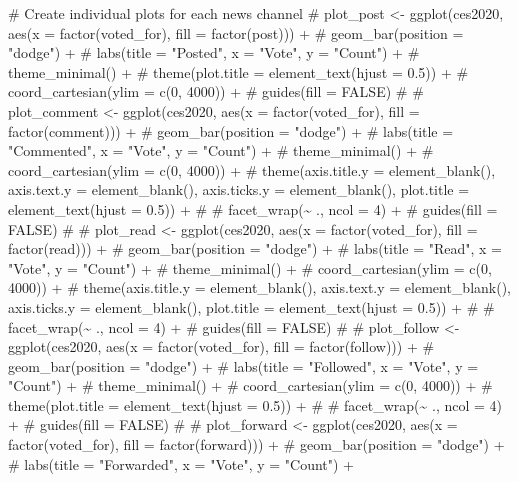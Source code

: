 \documentclass[
  letterpaper,
  DIV=11,
  numbers=noendperiod]{scrartcl}
\newenvironment{Shaded}{\begin{snugshade}}{\end{snugshade}}
\newcommand{\CommentTok}[1]{\textcolor[rgb]{0.37,0.37,0.37}{#1}}
\begin{document}
\begin{Shaded}
\begin{Highlighting}[]
\CommentTok{\# Create individual plots for each news channel}
\CommentTok{\# plot\_post \textless{}{-} ggplot(ces2020, aes(x = factor(voted\_for), fill = factor(post))) +}
\CommentTok{\#   geom\_bar(position = "dodge") +}
\CommentTok{\#   labs(title = "Posted", x = "Vote", y = "Count") +}
\CommentTok{\#   theme\_minimal() +}
\CommentTok{\#   theme(plot.title = element\_text(hjust = 0.5)) +}
\CommentTok{\#   coord\_cartesian(ylim = c(0, 4000)) +  }
\CommentTok{\#   guides(fill = FALSE)}
\CommentTok{\# }
\CommentTok{\# plot\_comment \textless{}{-} ggplot(ces2020, aes(x = factor(voted\_for), fill = factor(comment))) +}
\CommentTok{\#   geom\_bar(position = "dodge") +}
\CommentTok{\#   labs(title = "Commented", x = "Vote", y = "Count") +}
\CommentTok{\#   theme\_minimal() +}
\CommentTok{\#   coord\_cartesian(ylim = c(0, 4000)) +  }
\CommentTok{\#   theme(axis.title.y = element\_blank(), axis.text.y = element\_blank(), axis.ticks.y = element\_blank(), plot.title = element\_text(hjust = 0.5)) +}
\CommentTok{\#  \# facet\_wrap(\textasciitilde{} ., ncol = 4) +}
\CommentTok{\#   guides(fill = FALSE)}
\CommentTok{\# }
\CommentTok{\# plot\_read \textless{}{-} ggplot(ces2020, aes(x = factor(voted\_for), fill = factor(read))) +}
\CommentTok{\#   geom\_bar(position = "dodge") +}
\CommentTok{\#   labs(title = "Read", x = "Vote", y = "Count") +}
\CommentTok{\#   theme\_minimal() +}
\CommentTok{\#   coord\_cartesian(ylim = c(0, 4000)) +}
\CommentTok{\#   theme(axis.title.y = element\_blank(), axis.text.y = element\_blank(), axis.ticks.y = element\_blank(), plot.title = element\_text(hjust = 0.5)) +}
\CommentTok{\#  \# facet\_wrap(\textasciitilde{} ., ncol = 4) +}
\CommentTok{\#   guides(fill = FALSE)}
\CommentTok{\# }
\CommentTok{\# plot\_follow \textless{}{-} ggplot(ces2020, aes(x = factor(voted\_for), fill = factor(follow))) +}
\CommentTok{\#   geom\_bar(position = "dodge") +}
\CommentTok{\#   labs(title = "Followed", x = "Vote", y = "Count") +}
\CommentTok{\#   theme\_minimal() +}
\CommentTok{\#   coord\_cartesian(ylim = c(0, 4000)) +}
\CommentTok{\#   theme(plot.title = element\_text(hjust = 0.5)) +}
\CommentTok{\#  \# facet\_wrap(\textasciitilde{} ., ncol = 4) +}
\CommentTok{\#   guides(fill = FALSE)}
\CommentTok{\# }
\CommentTok{\# plot\_forward \textless{}{-} ggplot(ces2020, aes(x = factor(voted\_for), fill = factor(forward))) +}
\CommentTok{\#   geom\_bar(position = "dodge") +}
\CommentTok{\#   labs(title = "Forwarded", x = "Vote", y = "Count") +}

\end{Highlighting}
\end{Shaded}
\end{document}
